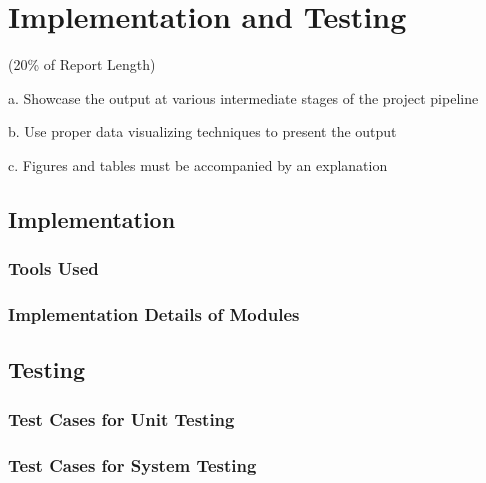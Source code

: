 \chapter{Implementation and Testing}


(20\% of Report Length)

a. Showcase the output at various intermediate stages of the project pipeline

b. Use proper data visualizing techniques to present the output

c. Figures and tables must be accompanied by an explanation
\section{Implementation}
\subsection{Tools Used}
\subsection{Implementation Details of Modules}
\section{Testing}
\subsection{Test Cases for Unit Testing}
\subsection{Test Cases for System Testing}